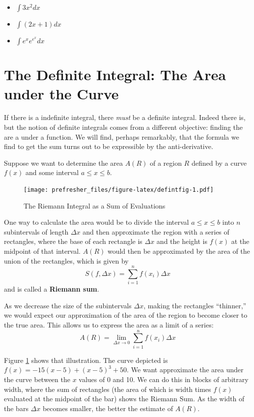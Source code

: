 \documentclass[]{book}
\providecommand{\tightlist}{%
  \setlength{\itemsep}{0pt}\setlength{\parskip}{0pt}}
\theoremstyle{definition}
\theoremstyle{definition}
\theoremstyle{definition}
\theoremstyle{remark}
\begin{document}
\begin{itemize}
\tightlist
\item
  \(\int 3x^2 dx\)
\item
  \(\int (2x+1)dx\)
\item
  \(\int e^x e^{e^x} dx\)
\end{itemize}

\hypertarget{the-definite-integral-the-area-under-the-curve}{%
\section{The Definite Integral: The Area under the Curve}\label{the-definite-integral-the-area-under-the-curve}}

If there is a indefinite integral, there \emph{must} be a definite integral. Indeed there is, but the notion of definite integrals comes from a different objective: finding the are a under a function. We will find, perhaps remarkably, that the formula we find to get the sum turns out to be expressible by the anti-derivative.

Suppose we want to determine the area \(A(R)\) of a region \(R\) defined by a curve \(f(x)\) and some interval \(a\le x \le b\).

\begin{figure}
\centering
\texttt{[image: prefresher\_files/figure-latex/defintfig-1.pdf]}
\caption{\label{fig:defintfig}The Riemann Integral as a Sum of Evaluations}
\end{figure}

One way to calculate the area would be to divide the interval \(a\le x\le b\) into \(n\) subintervals of length \(\Delta x\) and then approximate the region with a series of rectangles, where the base of each rectangle is \(\Delta x\) and the height is \(f(x)\) at the midpoint of that interval. \(A(R)\) would then be approximated by the area of the union of the rectangles, which is given by \[S(f,\Delta x)=\sum\limits_{i=1}^n f(x_i)\Delta x\] and is called a \textbf{Riemann sum}.

As we decrease the size of the subintervals \(\Delta x\), making the rectangles ``thinner,'' we would expect our approximation of the area of the region to become closer to the true area. This allows us to express the area as a limit of a series:
\[A(R)=\lim\limits_{\Delta x\to 0}\sum\limits_{i=1}^n f(x_i)\Delta x\]

Figure \ref{fig:defintfig} shows that illustration. The curve depicted is \(f(x) = -15(x - 5) + (x - 5)^3 + 50.\) We want approximate the area under the curve between the \(x\) values of 0 and 10. We can do this in blocks of arbitrary width, where the sum of rectangles (the area of which is width times \(f(x)\) evaluated at the midpoint of the bar) shows the Riemann Sum. As the width of the bars \(\Delta x\) becomes smaller, the better the estimate of \(A(R)\).
\end{document}
